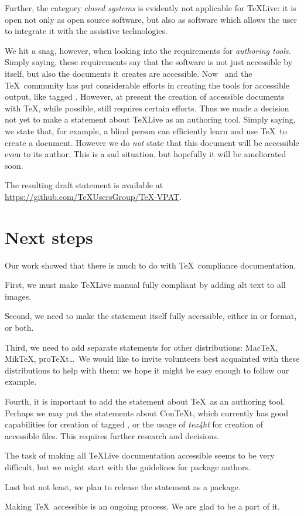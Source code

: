 \documentclass{ltugboat}
\begin{document}
Further, the category \emph{closed systems} is evidently not
applicable for \TeX Live: it is open not only as open source software,
but also as software which allows the user to integrate it with the
assistive technologies.

We hit a snag, however, when looking into the requirements for
\emph{authoring tools}.  Simply saying, these requirements say that
the software is not just accessible by itself, but also the documents
it creates are accessible.  Now \tug\ and the \TeX\ community has put
considerable efforts in creating the tools for accessible output, like
tagged .  However, at present the creation of accessible
documents with \TeX, while possible, still requires certain efforts.
Thus we made a decision not yet to make a statement about \TeX Live as
an authoring tool.  Simply saying, we state that, for example, a
blind person can efficiently learn and use \TeX\ to create a
document.  However we do \emph{not} state that this document will be
accessible even to its author.  This is a sad situation, but hopefully
it will be ameliorated soon.

The resulting draft statement is available at
\url{https://github.com/TeXUsersGroup/TeX-VPAT}.

\section{Next steps}
\label{sec:next_steps}

Our work showed that there is much to do with \TeX\ compliance
documentation.

First, we must make \TeX Live manual fully compliant by adding alt
text to all images.

Second, we need to make the statement itself fully accessible, either
in  or  format, or both.

Third, we need to add separate statements for other distributions:
Mac\TeX, Mik\TeX, pro\TeX t\ldots\  We would like to invite volunteers
best acquainted with these distributions to help with them:  we hope it
might be easy enough to follow our example.

Fourth, it is important to add the statement about \TeX\ as an
authoring tool.  Perhaps we may put the statements about Con\TeX t,
which currently has good capabilities for creation of tagged
, or the usage of \textsl{tex4ht} for creation of accessible
 files.  This requires further research and decisions.

The task of making all \TeX Live documentation accessible seems to be
very difficult, but we might start with the guidelines for package
authors.

Last but not least, we plan to release the statement as a 
package.

Making \TeX\ accessible is an ongoing process.  We are glad to be a
part of it.

\makesignature
\end{document}

